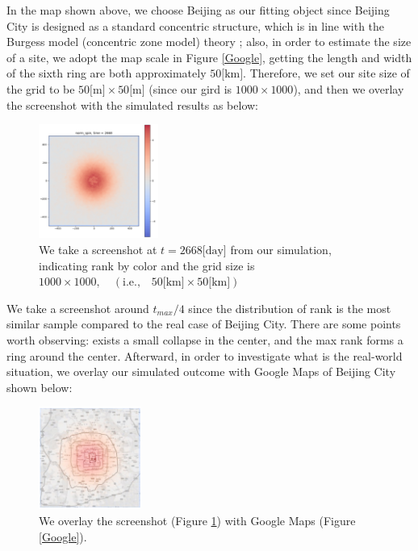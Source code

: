 \documentclass[10pt]{article}
\begin{document}
\begin{multicols}{2}
        In the map shown above, we choose Beijing as our fitting object since Beijing City is designed as a standard concentric structure, which is in line with the Burgess model (concentric zone model) theory \cite{ring_model}; also, in order to estimate the size of a site, we adopt the map scale in Figure \ref{Google}, getting the length and width of the sixth ring are both approximately $50 \text{[km]}$. Therefore, we set our site size of the grid to be $50\text{[m]} \times 50\text{[m]}$ (since our gird is $1000 \times 1000$), and then we overlay the screenshot with the simulated results as below:      

    \begin{figure}[H]
        \centering 
        \includegraphics[width = 0.35\textwidth]{t=2668.PNG}
        \caption{We take a screenshot at $t = 2668 \text{[day]}$ from our simulation, indicating rank by color and the grid size is $1000 \times 1000,\quad (\text{i.e.,} \quad 50\text{[km]} \times 50\text{[km]})$ }
        \label{2668}
    \end{figure}

        We take a screenshot around $t_{max}/4$ since the distribution of rank is the most similar sample compared to the real case of Beijing City. There are some points worth observing: exists a small collapse in the center, and the max rank forms a ring around the center. Afterward, in order to investigate what is the real-world situation, we overlay our simulated outcome with Google Maps of Beijing City shown below:
        
    \begin{figure}[H]
        \centering 
        \includegraphics[width = 0.3\textwidth]{overlay.PNG}
        \caption{We overlay the screenshot (Figure \ref{2668}) with Google Maps (Figure \ref{Google}).}
        \label{overlay}
    \end{figure}
    

\end{multicols}
\end{document}

